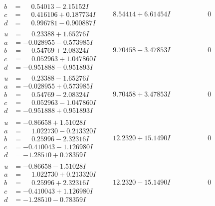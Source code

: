 \documentclass[1p]{elsarticle_modified}
\theoremstyle{definition}
\begin{document}
$$\begin{array}{c|c|c}
\begin{aligned}
b &= \phantom{-}0.54013 - 2.15152 I \\
c &= \phantom{-}0.416106 + 0.187734 I \\
d &= \phantom{-}0.996781 - 0.900887 I\end{aligned}
 & \phantom{-}8.54414 + 6.61454 I & \phantom{-0.000000 } 0 \\ \hline\begin{aligned}
u &= \phantom{-}0.23388 + 1.65276 I \\
a &= -0.028955 - 0.573985 I \\
b &= \phantom{-}0.54769 + 2.08324 I \\
c &= \phantom{-}0.052963 + 1.047860 I \\
d &= -0.951888 - 0.951893 I\end{aligned}
 & \phantom{-}9.70458 - 3.47853 I & \phantom{-0.000000 } 0 \\ \hline\begin{aligned}
u &= \phantom{-}0.23388 - 1.65276 I \\
a &= -0.028955 + 0.573985 I \\
b &= \phantom{-}0.54769 - 2.08324 I \\
c &= \phantom{-}0.052963 - 1.047860 I \\
d &= -0.951888 + 0.951893 I\end{aligned}
 & \phantom{-}9.70458 + 3.47853 I & \phantom{-0.000000 } 0 \\ \hline\begin{aligned}
u &= -0.86658 + 1.51028 I \\
a &= \phantom{-}1.022730 - 0.213320 I \\
b &= \phantom{-}0.25996 - 2.32316 I \\
c &= -0.410043 - 1.126980 I \\
d &= -1.28510 + 0.78359 I\end{aligned}
 & \phantom{-}12.2320 + 15.1490 I & \phantom{-0.000000 } 0 \\ \hline\begin{aligned}
u &= -0.86658 - 1.51028 I \\
a &= \phantom{-}1.022730 + 0.213320 I \\
b &= \phantom{-}0.25996 + 2.32316 I \\
c &= -0.410043 + 1.126980 I \\
d &= -1.28510 - 0.78359 I\end{aligned}
 & \phantom{-}12.2320 - 15.1490 I & \phantom{-0.000000 } 0 \\ \hline\begin{aligned}

\end{aligned}
\end{array}$$
\end{document}
